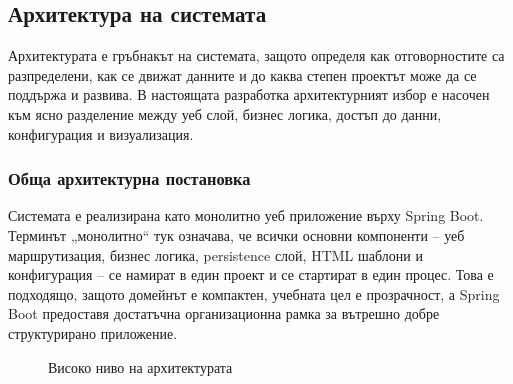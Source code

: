 \subsection{Архитектура на системата}

Архитектурата е гръбнакът на системата, защото определя как отговорностите са разпределени, как се движат данните и до каква степен проектът може да се поддържа и развива. В настоящата разработка архитектурният избор е насочен към ясно разделение между уеб слой, бизнес логика, достъп до данни, конфигурация и визуализация.

\subsubsection{Обща архитектурна постановка}

Системата е реализирана като монолитно уеб приложение върху Spring Boot. Терминът „монолитно“ тук означава, че всички основни компоненти -- уеб маршрутизация, бизнес логика, persistence слой, HTML шаблони и конфигурация -- се намират в един проект и се стартират в един процес. Това е подходящо, защото домейнът е компактен, учебната цел е прозрачност, а Spring Boot предоставя достатъчна организационна рамка за вътрешно добре структурирано приложение.

\begin{figure}[H]
    \centering
    \caption{Високо ниво на архитектурата}
    \label{fig:high-level-architecture}
\end{figure}

